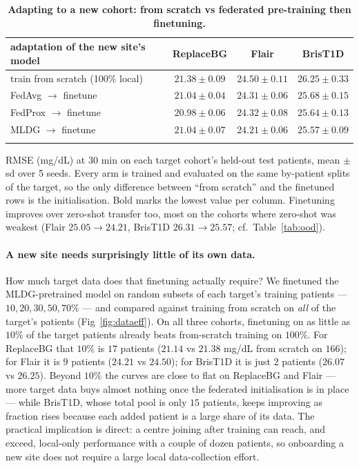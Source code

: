 \documentclass[10pt,letterpaper]{article}
\newlength\savedwidth
\newcommand\thickhline{\noalign{\global\savedwidth\arrayrulewidth\global\arrayrulewidth 2pt}%
\hline
\noalign{\global\arrayrulewidth\savedwidth}}
\begin{document}
\begin{table}[!ht]
\centering
\captionsetup{justification=centering,singlelinecheck=on}
\caption{\bf Adapting to a new cohort: from scratch vs federated pre-training then finetuning.}
\label{tab:finetune}
\begin{tabular}{lccc}
\thickhline
adaptation of the new site's model & ReplaceBG & Flair & BrisT1D \\
\hline
train from scratch (100\% local) & $21.38 \pm 0.09$ & $24.50 \pm 0.11$ & $26.25 \pm 0.33$ \\
\hline
FedAvg $\rightarrow$ finetune  & $21.04 \pm 0.04$ & $24.31 \pm 0.06$ & $25.68 \pm 0.15$ \\
FedProx $\rightarrow$ finetune & $\mathbf{20.98 \pm 0.06}$ & $24.32 \pm 0.08$ & $25.64 \pm 0.13$ \\
MLDG $\rightarrow$ finetune    & $21.04 \pm 0.07$ & $\mathbf{24.21 \pm 0.06}$ & $\mathbf{25.57 \pm 0.09}$ \\
\thickhline
\end{tabular}
\begin{center}
{\small RMSE (mg/dL) at 30 min on each target cohort's held-out test patients,
mean $\pm$ sd over 5 seeds. Every arm is trained and evaluated on the same
by-patient splits of the target, so the only difference between ``from scratch''
and the finetuned rows is the initialisation. Bold marks the lowest value per
column. Finetuning improves over zero-shot transfer too, most on the cohorts where
zero-shot was weakest (Flair $25.05\rightarrow24.21$, BrisT1D
$26.31\rightarrow25.57$; cf.\ Table~\ref{tab:ood}).}
\end{center}
\end{table}

\paragraph{A new site needs surprisingly little of its own data.} How much
target data does that finetuning actually require? We finetuned the
MLDG-pretrained model on random subsets of each target's training patients ---
$10, 20, 30, 50, 70\%$ --- and compared against training from scratch on
\emph{all} of the target's patients (Fig~\ref{fig:dataeff}). On all three cohorts,
finetuning on as little as $10\%$ of the target patients already beats
from-scratch training on $100\%$. For ReplaceBG that $10\%$ is $17$ patients
($21.14$ vs $21.38$ mg/dL from scratch on $166$); for Flair it is $9$ patients
($24.21$ vs $24.50$); for BrisT1D it is just $2$ patients ($26.07$ vs $26.25$).
Beyond $10\%$ the curves are close to flat on ReplaceBG and Flair --- more target
data buys almost nothing once the federated initialisation is in place --- while
BrisT1D, whose total pool is only $15$ patients, keeps improving as fraction rises
because each added patient is a large share of its data. The practical implication
is direct: a centre joining after training can reach, and exceed, local-only
performance with a couple of dozen patients, so onboarding a new site does not
require a large local data-collection effort.
\end{document}
